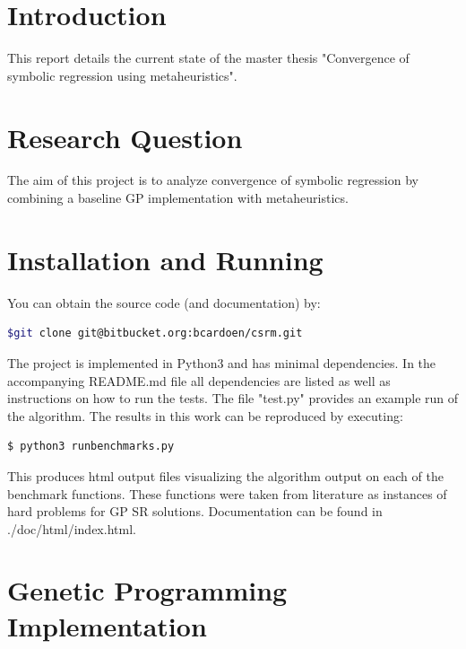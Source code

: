 \documentclass[10pt]{extarticle}
\begin{document}
\maketitle

\section{Introduction}
This report details the current state of the master thesis "Convergence of symbolic regression using metaheuristics".
\section{Research Question}
The aim of this project is to analyze convergence of symbolic regression by combining a baseline GP implementation with metaheuristics.


\section{Installation and Running}
You can obtain the source code (and documentation) by:
\begin{lstlisting}[language=Bash]
  $git clone git@bitbucket.org:bcardoen/csrm.git
\end{lstlisting}
The project is implemented in Python3 and has minimal dependencies. In the accompanying README.md file all dependencies are listed as well as instructions on how to run the tests. The file "test.py" provides an example run of the algorithm. The results in this work can be reproduced by executing:
\begin{lstlisting}[language=Python]
  $ python3 runbenchmarks.py
\end{lstlisting}
This produces html output files visualizing the algorithm output on each of the benchmark functions. These functions were taken from literature as instances of hard problems for GP SR solutions.
Documentation can be found in ./doc/html/index.html.
\section{Genetic Programming Implementation}
\end{document}
